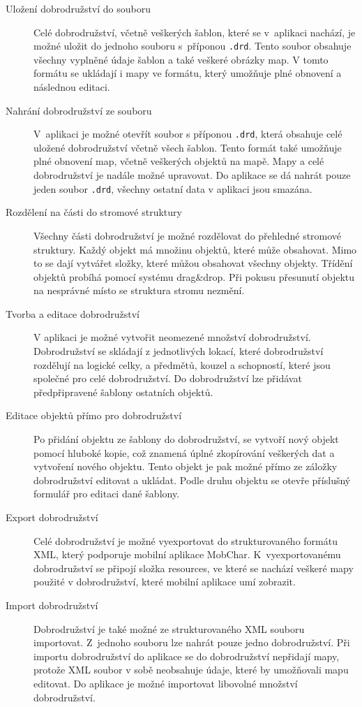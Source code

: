 \documentclass[thesis=B,czech]{resources/FITthesis}[2012/06/26]
\begin{document}
	\begin{description}
		\item[Uložení dobrodružství do souboru]
Celé dobrodružství, včetně veškerých šablon, které se v~aplikaci nachází, je možné uložit do jednoho souboru s~příponou \texttt{.drd}. Tento soubor obsahuje všechny vyplněné údaje šablon a také veškeré obrázky map. V tomto formátu se ukládají i mapy ve formátu, který umožňuje plné obnovení a následnou editaci. 

		\item[Nahrání dobrodružství ze souboru]
V~aplikaci je možné otevřít soubor s příponou \texttt{.drd}, která obsahuje celé uložené dobrodružství včetně všech šablon. Tento formát také umožňuje plné obnovení map, včetně veškerých objektů na mapě. Mapy a celé dobrodružství je nadále možné upravovat. Do aplikace se dá nahrát pouze jeden soubor \texttt{.drd}, všechny ostatní data v aplikaci jsou smazána.
 
		\item[Rozdělení na části do stromové struktury]
		Všechny části dobrodružství je možné rozdělovat do přehledné stromové struktury. Každý objekt má množinu objektů, které může obsahovat. Mimo to se dají vytvářet složky, které můžou obsahovat všechny objekty. Třídění objektů probíhá pomocí systému drag\&drop. Při pokusu přesunutí objektu na nesprávné místo se struktura stromu nezmění. 
		
		\item[Tvorba a editace dobrodružství]
V aplikaci je možné vytvořit neomezené množství dobrodružství. Dobrodružství se skládají z jednotlivých lokací, které dobrodružství rozdělují na logické celky, a předmětů, kouzel a schopností, které jsou společné pro celé dobrodružství. Do dobrodružství lze přidávat předpřipravené šablony ostatních objektů. 

		\item[Editace objektů přímo pro dobrodružství]
Po přidání objektu ze šablony do dobrodružství, se vytvoří nový objekt pomocí hluboké kopie, což znamená úplné zkopírování veškerých dat a vytvoření nového objektu. Tento objekt je pak možné přímo ze záložky dobrodružství editovat a ukládat. Podle druhu objektu se otevře příslušný formulář pro editaci dané šablony.

		\item[Export dobrodružství]
		Celé dobrodružství je možné vyexportovat do strukturovaného formátu XML, který podporuje mobilní aplikace MobChar. K~vyexportovanému dobrodružství se připojí složka resources, ve které se nachází veškeré mapy použité v dobrodružství, které mobilní aplikace umí zobrazit. 
		
		\item[Import dobrodružství]
		Dobrodružství je také možné ze strukturovaného XML souboru importovat. Z~jednoho souboru lze nahrát pouze jedno dobrodružství. Při importu dobrodružství do aplikace se do dobrodružství nepřidají mapy, protože XML soubor v sobě neobsahuje údaje, které by umožňovali mapu editovat. Do aplikace je možné importovat libovolné množství dobrodružství.
	\end{description}
	
\end{document}
